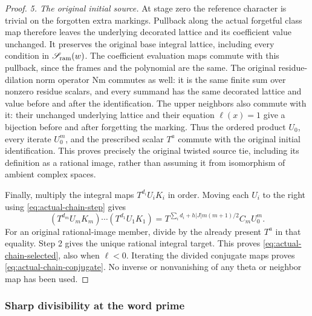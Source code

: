 \begin{proof}
\emph{5. The original initial source.}
At stage zero the reference character is trivial on the forgotten
extra markings.  Pullback along the actual forgetful class map
therefore leaves the underlying decorated lattice and its coefficient
value unchanged.  It preserves the original base integral lattice,
including every condition in $\mathscr S_{\rm ram}(w)$.  The
coefficient evaluation maps commute with this pullback, since the
frames and the polynomial are the same.  The original residue-dilation
norm operator $\mathrm{Nm}$ commutes as well: it is the same finite
sum over nonzero residue scalars, and every summand has the same
decorated lattice and value before and after the identification.
The upper neighbors also
commute with it: their unchanged underlying lattice and their equation
$\ell(x)=1$ give a bijection before and after forgetting the marking.
Thus the ordered product $U_0$, every iterate $U_0^m$, and the
prescribed scalar $T^a$ commute with the original initial
identification.  This proves precisely the original twisted source
tie, including its definition as a rational image, rather than
assuming it from isomorphism of ambient complex spaces.

Finally, multiply the integral maps $T^{d_i}U_iK_i$ in order.
Moving each $U_i$ to the right using
\eqref{eq:actual-chain-step} gives
\[
 (T^{d_m}U_mK_m)\cdots(T^{d_1}U_1K_1)
    =T^{\sum_i d_i+h|J|m(m+1)/2}C_mU_0^m.
\]
For an original rational-image member, divide by the already present
$T^a$ in that equality.  Step 2 gives the unique rational integral
target.  This proves \eqref{eq:actual-chain-selected}, also when
$\ell<0$.  Iterating the divided conjugate maps proves
\eqref{eq:actual-chain-conjugate}.  No inverse or nonvanishing of
any theta or neighbor map has been used.
\end{proof}


\subsubsection*{Sharp divisibility at the word prime}

